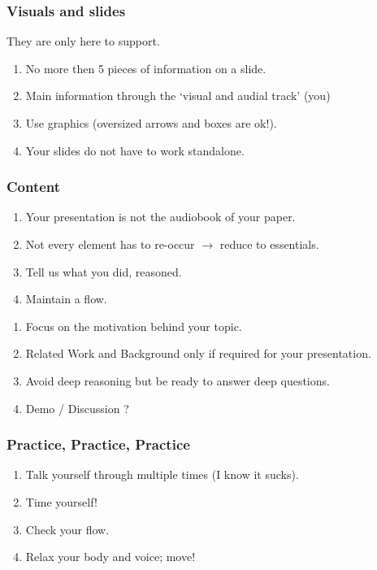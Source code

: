 \documentclass[xcolor={usenames,dvipsnames}]{beamer}
\begin{document}
\begin{frame}
	\frametitle{Visuals and slides}
	They are only here to \alert{support}.
	\begin{enumerate}
		\item \alert{No more} then 5 pieces of information on a slide.
		\item Main information through the `visual and audial track' (you)
		\item Use graphics (oversized arrows and boxes are ok!).
		\item Your slides do not have to work standalone.
	\end{enumerate}
\end{frame}

\begin{frame}
	\frametitle{Content}
	\begin{enumerate}
		\item Your presentation is \alert{not} the audiobook of your paper.
		\item Not every element has to re-occur $\rightarrow$ reduce to essentials.
		\item Tell us what you did, reasoned.
		\item Maintain a flow.
	\end{enumerate}
\end{frame}

\begin{frame}
	\begin{enumerate}
		\item Focus on the motivation behind your topic.
		\item Related Work and Background only if required for your presentation.
		\item Avoid deep reasoning \alert{but} be ready to answer deep questions. 
		\item Demo / Discussion ?
	\end{enumerate}
\end{frame}

\begin{frame}
	\frametitle{Practice, Practice, Practice}
	\begin{enumerate}
		\item Talk yourself through multiple times (I know it sucks).
		\item Time yourself!
		\item Check your flow.
		\item Relax your body and voice; move!
	\end{enumerate}
\end{frame}
\end{document}
